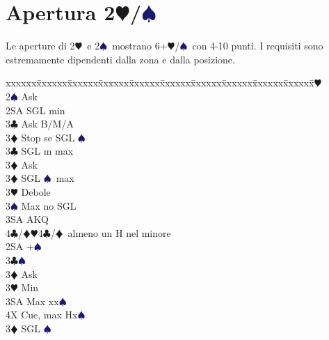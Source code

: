 \documentclass[a4paper,italian]{article}
\newcommand{\BC}{\textcolor{OliveGreen}{$\clubsuit$}}
\newcommand{\BD}{\textcolor{RedOrange}{$\vardiamondsuit$}}
\newcommand{\BH}{\textcolor{Red2}{$\varheartsuit${}}}
\newcommand{\BS}{\textcolor{MidnightBlue}{$\spadesuit${}}}
\newcommand{\pdfh}{\texorpdfstring{\BH{}}{H}}
\newcommand{\pdfs}{\texorpdfstring{\BS{}}{S}}
\newenvironment{bidtable}
{\begin{tabbing}

    xxxxxx\=xxxxxx\=xxxxxx\=xxxxxx\=xxxxxx\=xxxxxx\=xxxxxx\=xxxxxx\=xxxxxx\=xxxxxx\=\kill}
{\end{tabbing} }%
\begin{document}
                                    \section{Apertura 2\pdfh/\pdfs}
                                    \begin{multicols*}{2}
                                    Le aperture di 2\BH\ e 2\BS\ mostrano 6+\BH/\BS\ con 4-10 punti. I requisiti sono estremamente dipendenti
                                    dalla zona e dalla posizione.
                                        \begin{bidtable}
                                            2\BH\+\\
                                            2\BS \> Ask\+\\
                                            2SA \> SGL min\+\\
                                            3\BC \> Ask B/M/A\\
                                            3\BD \> Stop se SGL \BS \-\\
                                            3\BC \> SGL m max\+\\
                                            3\BD \> Ask\-\\
                                            3\BD \> SGL \BS\ max\\
                                            3\BH \> Debole\\
                                            3\BS \> Max no SGL\\
                                            3SA \> AKQ\\
                                            4\BC/\BD {}\BH 4\BC /\BD\ almeno un H nel minore\-\\
                                            2SA +\BS \+\\
                                            3\BC {}\BS \+\\
                                            3\BD \> Ask\+\\
                                            3\BH \> Min\\
                                            3SA \> Max xx\BS \\
                                            4X \> Cue, max Hx\BS\-\-\\
                                            3\BD \> SGL \BS \\

\end{bidtable}
\end{multicols*}
\end{document}
